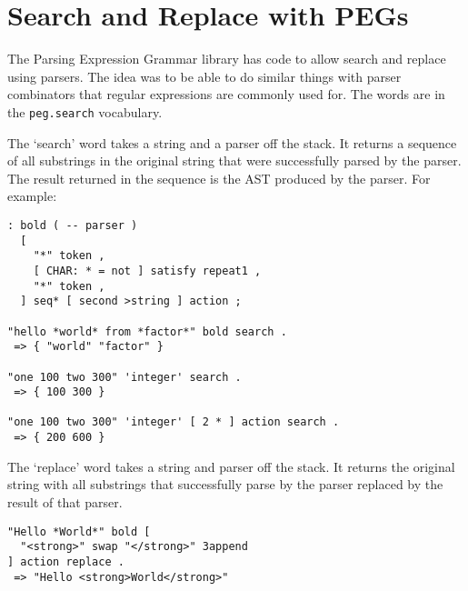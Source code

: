\chapter{Search and Replace with PEGs}\label{seachreplace}

The Parsing Expression Grammar library has code to allow search and replace using parsers. The idea was to be able to do similar things with parser combinators that regular expressions are commonly used for. The words are in the \texttt{peg.search} vocabulary.


The `search' word takes a string and a parser off the stack. It returns a sequence of all substrings in the original string that were successfully parsed by the parser. The result returned in the sequence is the AST produced by the parser. For example:

\begin{verbatim}
: bold ( -- parser )
  [
    "*" token ,
    [ CHAR: * = not ] satisfy repeat1 ,
    "*" token ,
  ] seq* [ second >string ] action ;

"hello *world* from *factor*" bold search . 
 => { "world" "factor" } 

"one 100 two 300" 'integer' search .
 => { 100 300 }

"one 100 two 300" 'integer' [ 2 * ] action search .
 => { 200 600 }
\end{verbatim}


The `replace' word takes a string and parser off the stack. It returns the original string with all substrings that successfully parse by the parser replaced by the result of that parser.

\begin{verbatim}
"Hello *World*" bold [ 
  "<strong>" swap "</strong>" 3append 
] action replace .
 => "Hello <strong>World</strong>"
\end{verbatim}


